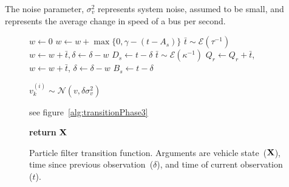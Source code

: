 \documentclass[draftcls,a4paper,onecolumn]{IEEEtran}\usepackage[]{graphicx}\usepackage[]{color}
\begin{document}
The noise parameter, $\sigma_v^2$
represents system noise, assumed to be small, 
and represents the average change in speed of a bus per second.


\begin{figure}[bt]
  \begin{algorithmic}
    
    \State $w\gets 0$
      \State $w\gets w + \max\{0, \gamma - (t - A_s)\}$
      \State $\bar t \sim \mathcal{E}(\tau^{-1})$
      \State $w\gets w + \bar t, \delta\gets \delta - w$
        \State $D_s\gets t - \delta$
      \EndIf
      \State $\bar t \sim \mathcal{E}(\kappa^{-1})$
      \State $Q_r\gets Q_r + \bar t$, $w\gets w+\bar t$, $\delta\gets \delta - w$
        \State $B_s\gets t - \delta$
      \EndIf
    \EndIf
    \EndPhase
    
    
    \State $v_k^{(i)}\sim \mathcal{N}(v, \delta\sigma_v^2)$
    \EndPhase
    
    \State see figure~\ref{alg:transitionPhase3}
    \EndPhase
    
    \State \textbf{return} $\mathbf{X}$
    \EndFunction
  \end{algorithmic}
  \caption{Particle filter transition function. Arguments are vehicle state~($\mathbf{X}$), time since previous observation~($\delta$), and time of current observation ($t$).}
  \label{alg:transition}
\end{figure}
\end{document}
